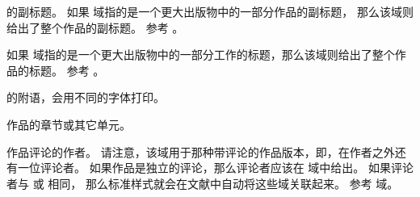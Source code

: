 \begin{fieldlist}

 的副标题。
如果  域指的是一个更大出版物中的一部分作品的副标题，
那么该域则给出了整个作品的副标题。
参考 。




如果  域指的是一个更大出版物中的一部分工作的标题，那么该域则给出了整个作品的标题。
参考 。




 的附语，会用不同的字体打印。




作品的章节或其它单元。




作品评论的作者。
请注意，该域用于那种带评论的作品版本，即，在作者之外还有一位评论者。
如果作品是独立的评论，那么评论者应该在  域中给出。
如果评论者与  或  相同，
那么标准样式就会在文献中自动将这些域关联起来。
参考  域。




\end{fieldlist}

